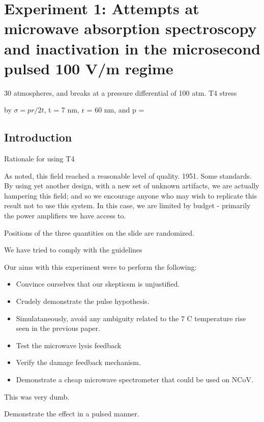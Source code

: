 \documentclass[paper.tex]{subfiles}
\begin{document}
\section{Experiment 1: Attempts at microwave absorption spectroscopy and inactivation in the microsecond pulsed 100 V/m regime}

\cite{Osmotic2003} 30 atmospheres, and breaks at a pressure differential of 100 atm.
T4 stress

by $\sigma = pr / 2t $,
t = 7 nm, r = 60 nm, and p =

\subsection{Introduction}



Rationale for using T4


\begin{autem}
As noted, this field reached a reasonable level of quality. 1951. Some standards.
By using yet another design, with a new set of unknown artifacts, we are actually hampering this field;
and so we encourage anyone who may wish to replicate this result not to use this system.
In this case, we are limited by budget - primarily the power amplifiers we have access to.
\end{autem}


Positions of the three quantities on the slide are randomized\cite{first2000}.

We have tried to comply with the guidelines

Our aims with this experiment were to perform the following:

\begin{itemize}
	\item Convince ourselves that our skepticsm is unjustified.
	\item Crudely demonstrate the pulse hypothesis.
	\item Simulataneously, avoid any ambiguity related to the 7 C temperature rise seen in the previous paper.
	\item Test the microwave lysis feedback
	\item Verify the damage feedback mechanism.
	\item Demonstrate a cheap microwave spectrometer that could be used on NCoV.
\end{itemize}


This was very dumb.


Demonstrate the effect in a pulsed manner.
\end{document}
